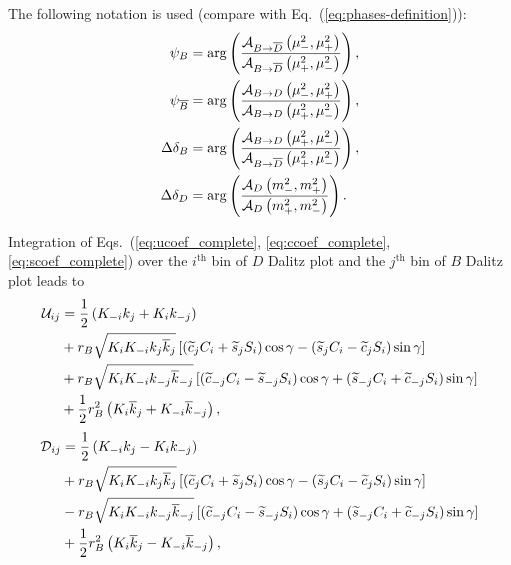 \documentclass[a4paper,11pt]{article}
\begin{document}
The following notation is used (compare with Eq.~(\ref{eq:phases-definition})):
\begin{subequations}\label{eq:phase_nonation}
 \begin{align}
  \label{eq:psib}
  \psi_{B}  &= \mathrm{arg}\left(\frac{\mathcal{A}_{B\to\overline{D}}\left(\mu^2_{-},\mu^2_{+}\right)}{\mathcal{A}_{B\to\overline{D}}\left(\mu^2_{+},\mu^2_{-}\right)}\right), \\ 
  \label{eq:psibb}
  \psi_{\overline{B}} &= \mathrm{arg}\left(\frac{\mathcal{A}_{B\to D}   \left(\mu^2_{-},\mu^2_{+}\right)}{\mathcal{A}_{B\to D}   \left(\mu^2_{+},\mu^2_{-}\right)}\right), \\
  \label{eq:delb}
  \Delta\delta_B  &= \mathrm{arg}\left(\frac{\mathcal{A}_{B\to D}   \left(\mu^2_{+},\mu^2_{-}\right)   }{\mathcal{A}_{B\to\overline{D}}\left(\mu^2_{+},\mu^2_{-}\right)}\right), \\
  \Delta\delta_D  &= \mathrm{arg}\left( \frac{\mathcal{A}_D    \left(m_-^2,m_+^2\right)}{\mathcal{A}_D    \left(m_+^2,m_-^2\right)} \right).
 \end{align}
\end{subequations}

Integration of Eqs.~(\ref{eq:ucoef_complete}, \ref{eq:ccoef_complete}, 
\ref{eq:scoef_complete}) over the $i^{\mathrm{th}}$ bin of $D$ Dalitz 
plot and the $j^{\mathrm{th}}$ bin of $B$ Dalitz plot
leads to
\begin{equation}\label{eq:ucoef_binned_complete}
\begin{split}
 \mathcal{U}_{ij} &= \frac{1}{2}\left(K_{-i}k_j + K_ik_{-j}\right) \\
             &+ r_{B}\sqrt{K_iK_{-i}k_j\overline{k}_j}
             \left[\left(\widetilde{c}_j C_i + \widetilde{s}_j S_i\right)\cos{\gamma} -
                   \left(\widetilde{s}_j C_i - \widetilde{c}_j S_i\right)\sin{\gamma}\right]\\
             &+r_{B}\sqrt{K_iK_{-i}k_{-j}\overline{k}_{-j}}
             \left[\left(\widetilde{c}_{-j}C_i - \widetilde{s}_{-j}S_i\right)\cos{\gamma} +
                   \left(\widetilde{s}_{-j}C_i + \widetilde{c}_{-j}S_i\right)\sin{\gamma}\right]\\
             &+\frac{1}{2}r_{B}^2\left(K_i\overline{k}_j + K_{-i}\overline{k}_{-j}\right),
\end{split}
\end{equation}
\begin{equation}\label{eq:ccoef_binned_complete}
 \begin{split}
  \mathcal{D}_{ij} &= \frac{1}{2}\left(K_{-i}k_j - K_ik_{-j}\right) \\
             &+ r_{B}\sqrt{K_iK_{-i}k_j\overline{k}_j}
             \left[\left(\widetilde{c}_jC_i + \widetilde{s}_jS_i\right)\cos{\gamma} -
                   \left(\widetilde{s}_jC_i - \widetilde{c}_jS_i\right)\sin{\gamma}\right]\\
             &-r_{B}\sqrt{K_iK_{-i}k_{-j}\overline{k}_{-j}}
             \left[\left(\widetilde{c}_{-j}C_i - \widetilde{s}_{-j}S_i\right)\cos{\gamma} +
                   \left(\widetilde{s}_{-j}C_i + \widetilde{c}_{-j}S_i\right)\sin{\gamma}\right]\\
             &+\frac{1}{2}r_{B}^2\left(K_i\overline{k}_j - K_{-i}\overline{k}_{-j}\right),
 \end{split}
\end{equation}
\end{document}
